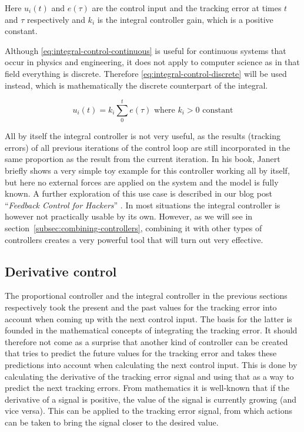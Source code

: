 Here $u_i(t)$ and $e(\tau)$ are the control input and the tracking error at times $t$ and $\tau$ respectively and $k_i$ is the integral controller gain, which is a positive constant.

Although \autoref{eq:integral-control-continuous} is useful for continuous systems that occur in physics and engineering, it does not apply to computer science as in that field everything is discrete. Therefore \autoref{eq:integral-control-discrete} will be used instead, which is mathematically the discrete counterpart of the integral.

\begin{equation}\label{eq:integral-control-discrete}
u_i(t) = k_i \sum_{0}^{t}e(\tau) \text{\ \ \ \ where } k_i > 0 \text{ constant}
\end{equation}

All by itself the integral controller is not very useful, as the results (tracking errors) of all previous iterations of the control loop are still incorporated in the same proportion as the result from the current iteration. In his book, Janert \cite{janert2013-feedback} briefly shows a very simple toy example for this controller working all by itself, but here no external forces are applied on the system and the model is fully known. A further exploration of this use case is described in our blog post ``\textit{Feedback Control for Hackers}'' \cite{heest2015-feedback-for-hackers}. In most situations the integral controller is however not practically usable by its own. However, as we will see in section~\ref{subsec:combining-controllers}, combining it with other types of controllers creates a very powerful tool that will turn out very effective.

\subsection{Derivative control}
The proportional controller and the integral controller in the previous sections respectively took the present and the past values for the tracking error into account when coming up with the next control input. The basis for the latter is founded in the mathematical concepts of integrating the tracking error. It should therefore not come as a surprise that another kind of controller can be created that tries to predict the future values for the tracking error and takes these predictions into account when calculating the next control input. This is done by calculating the derivative of the tracking error signal and using that as a way to predict the next tracking errors. From mathematics it is well-known that if the derivative of a signal is positive, the value of the signal is currently growing (and vice versa). This can be applied to the tracking error signal, from which actions can be taken to bring the signal closer to the desired value.

